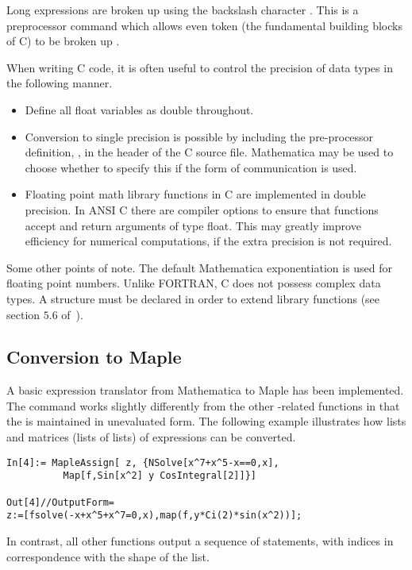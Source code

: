 \documentclass [12pt,twoside]{article}
\begin{document}
Long expressions are broken up using the backslash character \mma{\\}. This is a
preprocessor command which allows even token (the fundamental building blocks of C) to be
broken up \cite[section~2.1.2]{harbison-91}.

When writing C code, it is often useful to control the precision of data types in the
following manner. 
\begin{itemize}
\item Define all float variables as double throughout.

\item Conversion to single precision is possible by including the pre-processor
definition, , in the header of the C source file.
Mathematica may be used to choose whether to specify this if the  form
of communication is used.

\item Floating point math library functions in C are implemented in
double precision. In ANSI C there are compiler options to ensure that
functions accept and return arguments of type float. This may greatly
improve efficiency for numerical computations, if the extra precision is not required.
\end{itemize}
Some other points of note.
The default Mathematica exponentiation is used for floating point numbers.
Unlike FORTRAN, C does not possess complex data types. A  structure
must be declared in order to extend library functions (see section $5.6$
of~\cite{harbison-91}).

\subsection{Conversion to Maple}

A basic expression translator from Mathematica to Maple has been implemented.
The  command works slightly differently from the other
-related
functions in that the  is maintained in unevaluated form. The following
example illustrates how lists and matrices (lists of lists) of expressions
can be converted.
\begin{verbatim}
In[4]:= MapleAssign[ z, {NSolve[x^7+x^5-x==0,x],
          Map[f,Sin[x^2] y CosIntegral[2]]}]

Out[4]//OutputForm=
z:=[fsolve(-x+x^5+x^7=0,x),map(f,y*Ci(2)*sin(x^2))];
\end{verbatim}
In contrast, all other  functions output a sequence of statements, with 
 indices in correspondence with the shape of the list.
\end{document}
